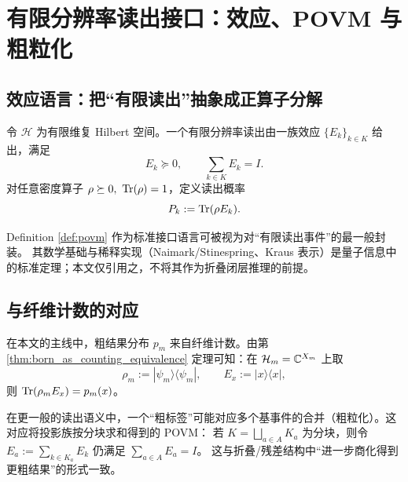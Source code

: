 \section{有限分辨率读出接口：效应、POVM 与粗粒化}

\subsection{效应语言：把“有限读出”抽象成正算子分解}

\begin{definition}
\label{def:povm}
令 $\mathcal H$ 为有限维复 Hilbert 空间。一个有限分辨率读出由一族效应 $\{E_k\}_{k\in K}$ 给出，满足
$$
E_k\succeq 0,\qquad \sum_{k\in K}E_k=I.
$$
对任意密度算子 $\rho\succeq 0,\ \Tr(\rho)=1$，定义读出概率
$$
P_k:=\mathrm{Tr}(\rho E_k).
$$
\end{definition}

\begin{remark}
Definition \ref{def:povm} 作为标准接口语言可被视为对“有限读出事件”的最一般封装。
其数学基础与稀释实现（Naimark/Stinespring、Kraus 表示）是量子信息中的标准定理；本文仅引用之，不将其作为折叠闭层推理的前提。
\end{remark}

\subsection{与纤维计数的对应}

在本文的主线中，粗结果分布 $p_m$ 来自纤维计数。由第 \ref{thm:born_as_counting_equivalence} 定理可知：在 $\mathcal H_m=\mathbb{C}^{X_m}$ 上取
$$
\rho_m:=|\psi_m\rangle\langle\psi_m|,
\qquad
E_x:=|x\rangle\langle x|,
$$
则 $\mathrm{Tr}(\rho_m E_x)=p_m(x)$。

\begin{remark}
在更一般的读出语义中，一个“粗标签”可能对应多个基事件的合并（粗粒化）。这对应将投影族按分块求和得到的 POVM：
若 $K=\bigsqcup_{a\in A}K_a$ 为分块，则令
$
E_a:=\sum_{k\in K_a}E_k
$
仍满足 $\sum_{a\in A}E_a=I$。
这与折叠/残差结构中“进一步商化得到更粗结果”的形式一致。
\end{remark}

